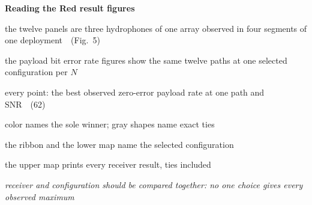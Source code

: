 \documentclass[aspectratio=169,10pt]{beamer}
\begin{document}
\begin{frame}[plain]
  \centering
  \vspace{0.8cm}
  {\bfseries\LARGE Reading the Red result figures\par}
  \vspace{0.45cm}
    {\large the twelve panels are three hydrophones of one array observed
   in four segments of one deployment~~(Fig.~5)\par}
  \vspace{0.30cm}
  {\large the payload bit error rate figures show the same twelve paths
   at one selected configuration per \(N\)\par}
  \vspace{0.30cm}
  {\large every point: the best observed zero-error payload rate at one
   path and SNR~~(62)\par}
  \vspace{0.30cm}
  {\large color names the sole winner; gray shapes name exact ties\par}
  \vspace{0.30cm}
  {\large the ribbon and the lower map name the selected configuration\par}
  \vspace{0.30cm}
  {\large the upper map prints every receiver result, ties included\par}

  \vspace{0.45cm}
  {\itshape receiver and configuration should be compared together: no one
   choice gives every observed maximum\par}
\end{frame}
\end{document}
